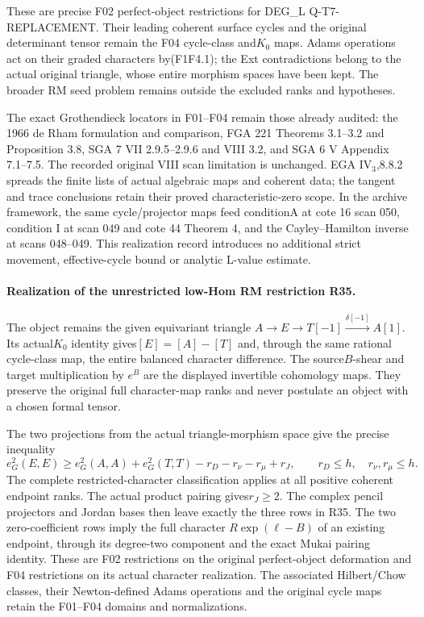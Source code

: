 These are precise F02 perfect-object restrictions for
DEG\_L Q-T7-REPLACEMENT. Their leading coherent surface
cycles and the original determinant tensor remain the F04
cycle-class and$K_0$ maps. Adams operations act on their
graded characters by(F1F4.1); the Ext contradictions
belong to the actual original triangle, whose entire
morphism spaces have been kept. The broader RM seed
problem remains outside the excluded ranks and hypotheses.

The exact Grothendieck locators in F01--F04 remain those
already audited: the 1966 de Rham formulation and comparison,
FGA 221 Theorems 3.1--3.2 and Proposition 3.8, SGA 7 VII 2.9.5--2.9.6
and VIII 3.2, and SGA 6 V Appendix 7.1--7.5. The recorded
original VIII scan limitation is unchanged. EGA IV$_3$,8.8.2
spreads the finite lists of actual algebraic maps and
coherent data; the tangent and trace conclusions retain
their proved characteristic-zero scope. In the archive
framework, the same cycle/projector maps feed conditionA
at cote 16 scan 050, condition I at scan 049 and cote 44
Theorem 4, and the Cayley--Hamilton inverse at scans 048--049.
This realization record introduces no additional strict
movement, effective-cycle bound or analytic L-value estimate.


\paragraph{Realization of the unrestricted low-Hom RM restriction R35.}
The object remains the given equivariant triangle
$A\to E\to T[-1]\xrightarrow{\delta[-1]}A[1]$.
Its actual$K_0$ identity gives$[E]=[A]-[T]$ and, through
the same rational cycle-class map, the entire balanced character
difference. The source$B$-shear and target multiplication by
$e^B$ are the displayed invertible cohomology maps. They
preserve the original full character-map ranks and never
postulate an object with a chosen formal tensor.

The two projections from the actual triangle-morphism space
give the precise inequality
\[
 e^2_G(E,E)\ge e^2_G(A,A)+e^2_G(T,T)
       -r_D-r_\nu-r_\mu+r_J,
 \qquad r_D\le h,\quad r_\nu,r_\mu\le h.
\]
The complete restricted-character classification applies at
all positive coherent endpoint ranks. The actual product
pairing gives$r_J\ge2$. The complex pencil projectors and
Jordan bases then leave exactly the three rows in R35.
The two zero-coefficient rows imply the full character
$R\exp(\ell-B)$ of an existing endpoint, through its
degree-two component and the exact Mukai pairing identity.
These are F02 restrictions on the original perfect-object
deformation and F04 restrictions on its actual character
realization. The associated Hilbert/Chow classes, their
Newton-defined Adams operations and the original cycle maps
retain the F01--F04 domains and normalizations.

